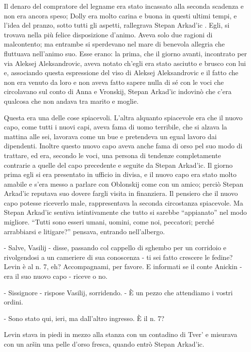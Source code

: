 Il denaro del compratore del legname era stato incassato alla seconda scadenza e non era ancora speso; Dolly era molto carina e buona in questi ultimi tempi, e l'idea del pranzo, sotto tutti gli aspetti, rallegrava Stepan Arkad'ic . Egli, si trovava nella più felice disposizione d'animo. Aveva solo due ragioni di malcontento; ma entrambe si sperdevano nel mare di benevola allegria che fluttuava nell'animo suo. Esse erano: la prima, che il giorno avanti, incontrato per via Aleksej Aleksandrovic, aveva notato ch'egli era stato asciutto e brusco con lui e, associando questa espressione del viso di Aleksej Aleksandrovic e il fatto che non era venuto da loro e non aveva fatto sapere nulla di sé con le voci che circolavano sul conto di Anna e Vronskij, Stepan Arkad'ic indovinò che c'era qualcosa che non andava tra marito e moglie. 

Questa era una delle cose spiacevoli. L'altra alquanto spiacevole era che il nuovo capo, come tutti i nuovi capi, aveva fama di uomo terribile, che si alzava la mattina alle sei, lavorava come un bue e pretendeva un egual lavoro dai dipendenti. Inoltre questo nuovo capo aveva anche fama di orso pel suo modo di trattare, ed era, secondo le voci, una persona di tendenze completamente contrarie a quelle del capo precedente e seguite da Stepan Arkad'ic. Il giorno prima egli si era presentato in ufficio in divisa, e il nuovo capo era stato molto amabile e s'era messo a parlare con Oblonskij come con un amico; perciò Stepan Arkad'ic reputava suo dovere fargli visita in finanziera. Il pensiero che il nuovo capo potesse riceverlo male, rappresentava la seconda circostanza spiacevole. Ma Stepan Arkad'ic sentiva istintivamente che tutto si sarebbe ``appianato'' nel modo migliore. ``Tutti sono esseri umani, uomini, come noi, peccatori; perché arrabbiarsi e litigare?'' pensava, entrando nell'albergo. 

- Salve, Vasilij - disse, passando col cappello di sghembo per un corridoio e rivolgendosi a un cameriere di sua conoscenza - ti sei fatto crescere le fedine? Levin è al n. 7, eh? Accompagnami, per favore. E informati se il conte Anickin - era il suo nuovo capo - riceve o no. 

- Sissignore - rispose Vasilij, sorridendo. - È un pezzo che attendiamo i vostri ordini. 

- Sono stato qui, ieri, ma dall'altro ingresso. È il n. 7? 

Levin stava in piedi in mezzo alla stanza con un contadino di Tver' e misurava con un aršin una pelle d'orso fresca, quando entrò Stepan Arkad'ic. 

